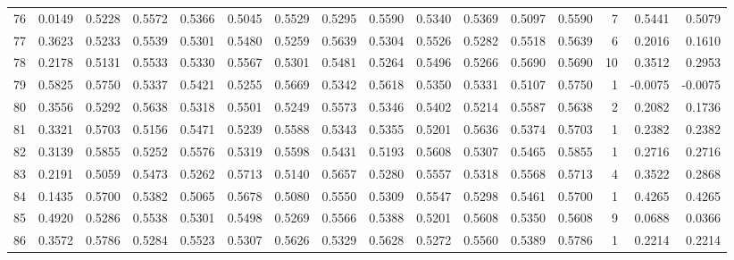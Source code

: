 \begin{tabular}{lrrrrrrrrrrrrrrr}
76  &      0.0149 &  0.5228 &  0.5572 &  0.5366 &  0.5045 &  0.5529 &  0.5295 &  0.5590 &  0.5340 &  0.5369 &   0.5097 &     0.5590 &      7 &                    0.5441 &                     0.5079 \\
77  &      0.3623 &  0.5233 &  0.5539 &  0.5301 &  0.5480 &  0.5259 &  0.5639 &  0.5304 &  0.5526 &  0.5282 &   0.5518 &     0.5639 &      6 &                    0.2016 &                     0.1610 \\
78  &      0.2178 &  0.5131 &  0.5533 &  0.5330 &  0.5567 &  0.5301 &  0.5481 &  0.5264 &  0.5496 &  0.5266 &   0.5690 &     0.5690 &     10 &                    0.3512 &                     0.2953 \\
79  &      0.5825 &  0.5750 &  0.5337 &  0.5421 &  0.5255 &  0.5669 &  0.5342 &  0.5618 &  0.5350 &  0.5331 &   0.5107 &     0.5750 &      1 &                   -0.0075 &                    -0.0075 \\
80  &      0.3556 &  0.5292 &  0.5638 &  0.5318 &  0.5501 &  0.5249 &  0.5573 &  0.5346 &  0.5402 &  0.5214 &   0.5587 &     0.5638 &      2 &                    0.2082 &                     0.1736 \\
81  &      0.3321 &  0.5703 &  0.5156 &  0.5471 &  0.5239 &  0.5588 &  0.5343 &  0.5355 &  0.5201 &  0.5636 &   0.5374 &     0.5703 &      1 &                    0.2382 &                     0.2382 \\
82  &      0.3139 &  0.5855 &  0.5252 &  0.5576 &  0.5319 &  0.5598 &  0.5431 &  0.5193 &  0.5608 &  0.5307 &   0.5465 &     0.5855 &      1 &                    0.2716 &                     0.2716 \\
83  &      0.2191 &  0.5059 &  0.5473 &  0.5262 &  0.5713 &  0.5140 &  0.5657 &  0.5280 &  0.5557 &  0.5318 &   0.5568 &     0.5713 &      4 &                    0.3522 &                     0.2868 \\
84  &      0.1435 &  0.5700 &  0.5382 &  0.5065 &  0.5678 &  0.5080 &  0.5550 &  0.5309 &  0.5547 &  0.5298 &   0.5461 &     0.5700 &      1 &                    0.4265 &                     0.4265 \\
85  &      0.4920 &  0.5286 &  0.5538 &  0.5301 &  0.5498 &  0.5269 &  0.5566 &  0.5388 &  0.5201 &  0.5608 &   0.5350 &     0.5608 &      9 &                    0.0688 &                     0.0366 \\
86  &      0.3572 &  0.5786 &  0.5284 &  0.5523 &  0.5307 &  0.5626 &  0.5329 &  0.5628 &  0.5272 &  0.5560 &   0.5389 &     0.5786 &      1 &                    0.2214 &                     0.2214 \\

\end{tabular}
